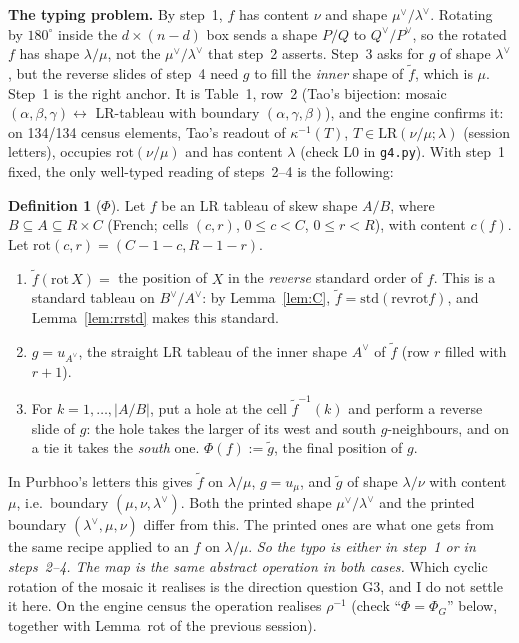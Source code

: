 \documentclass[11pt]{article}
\theoremstyle{definition}
\newtheorem{definition}[theorem]{Definition}
\newcommand{\LR}{\mathrm{LR}}
\newcommand{\std}{\mathrm{std}}
\newcommand{\rr}{\mathrm{revrot}}
\begin{document}
\textbf{The typing problem.} By step~1, $f$ has content $\nu$ and shape $\mu^\vee/\lambda^\vee$. Rotating by $180^\circ$
inside the $d\times(n-d)$ box sends a shape $P/Q$ to $Q^\vee/P^\vee$, so the rotated $f$ has shape $\lambda/\mu$, not the
$\mu^\vee/\lambda^\vee$ that step~2 asserts. Step~3 asks for $g$ of shape $\lambda^\vee$, but the reverse slides of step~4
need $g$ to fill the \emph{inner} shape of $\tilde f$, which is $\mu$. Step~1 is the right anchor. It is Table~1, row~2
(Tao's bijection: mosaic $(\alpha,\beta,\gamma)\leftrightarrow$ LR-tableau with boundary $(\alpha,\gamma,\beta)$), and the engine confirms
it: on 134/134 census elements, Tao's readout of $\kappa^{-1}(T)$, $T\in\LR(\nu/\mu;\lambda)$ (session letters), occupies $\mathrm{rot}(\nu/\mu)$
and has content $\lambda$ (check L0 in \texttt{g4.py}). With step~1 fixed, the only well-typed reading of steps~2--4 is the following:
\begin{definition}[$\Phi$]\label{def:phi}
Let $f$ be an LR tableau of skew shape $A/B$, where $B\subseteq A\subseteq R\times C$ (French; cells $(c,r)$, $0\le c<C$, $0\le r<R$),
with content $c(f)$. Let $\mathrm{rot}(c,r)=(C-1-c,R-1-r)$.
\begin{enumerate}
\item $\tilde f(\mathrm{rot}\,X)=$ the position of $X$ in the \emph{reverse} standard order of $f$. This is a standard tableau on $B^\vee/A^\vee$: by Lemma~\ref{lem:C}, $\tilde f=\std(\rr f)$, and Lemma~\ref{lem:rrstd} makes this standard.
\item $g=u_{A^\vee}$, the straight LR tableau of the inner shape $A^\vee$ of $\tilde f$ (row $r$ filled with $r+1$).
\item For $k=1,\dots,|A/B|$, put a hole at the cell $\tilde f^{-1}(k)$ and perform a reverse slide of $g$: the hole takes the larger of its
west and south $g$-neighbours, and on a tie it takes the \emph{south} one. $\Phi(f):=\tilde g$, the final position of $g$.
\end{enumerate}
\end{definition}
In Purbhoo's letters this gives $\tilde f$ on $\lambda/\mu$, $g=u_\mu$, and $\tilde g$ of shape $\lambda/\nu$ with content $\mu$,
i.e.\ boundary $(\mu,\nu,\lambda^\vee)$. Both the printed shape $\mu^\vee/\lambda^\vee$ and the printed boundary
$(\lambda^\vee,\mu,\nu)$ differ from this. The printed ones are what one gets from the same recipe applied to an $f$ on
$\lambda/\mu$. \emph{So the typo is either in step~1 or in steps~2--4. The map is the same abstract operation in both
cases.} Which cyclic rotation of the mosaic it realises is the direction question G3, and I do not settle it here. On the
engine census the operation realises $\rho^{-1}$ (check ``$\Phi=\Phi_G$'' below, together with Lemma~rot of the previous
session).
\end{document}
